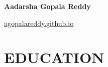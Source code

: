\documentclass[10pt, letterpaper]{article}
\begin{document}
\begin{header}
  \begin{minipage}[t]{0.65\textwidth}
    \fontsize{20pt}{20pt}\selectfont \textbf{Aadarsha Gopala Reddy}\\
    \normalsize
    \mbox{}%
    \kern {}%
    \AND%
    \kern {}%
    \mbox{}%
  \end{minipage}
  \hfill %
  \begin{minipage}[t]{0.15\textwidth}
    \raggedleft %
    \href{https://agopalareddy.github.io}{agopalareddy.github.io}
  \end{minipage}
  \hfill %
  \begin{minipage}[t]{0.11\textwidth}
    \raggedleft %
  \end{minipage}
\end{header}

\vspace{\headerSpacing} %

\section{EDUCATION}
\end{document}
